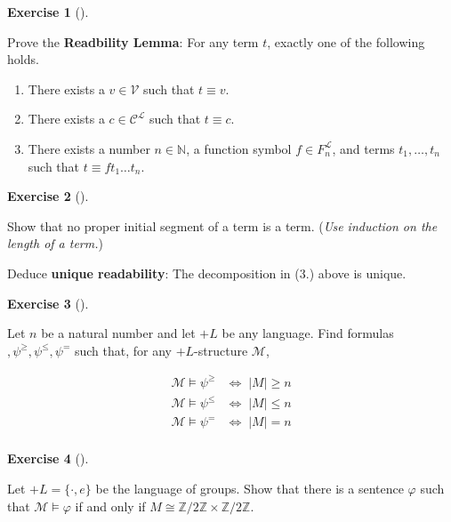 \documentclass[
]{article}
\theoremstyle{definition}
\newtheorem{exercise}{Exercise}[section]
\theoremstyle{remark}
\begin{document}
\begin{exercise}[]\protect\hypertarget{exr-}{}\label{exr-}

\hfill\break
Prove the \textbf{Readbility Lemma}: For any term \(t\), exactly one of
the following holds.

\begin{enumerate}
\def\labelenumi{\arabic{enumi}.}
\item
  There exists a \(v \in \mathcal{V}\) such that \(t \equiv v\).
\item
  There exists a \(c \in \mathcal{C}^{\mathcal{L}}\) such that
  \(t \equiv c\).
\item
  There exists a number \(n \in \mathbb{N}\), a function symbol \(f
  \in F_n^{\mathcal{L}}\), and terms \(t_1,
  \dots, t_n\) such that \(t \equiv ft_1\dots t_n\).
\end{enumerate}

\end{exercise}

\begin{exercise}[]\protect\hypertarget{exr-}{}\label{exr-}

\hfill\break
Show that no proper initial segment of a term is a term. (\emph{Use
induction on the length of a term.})

Deduce \textbf{unique readability}: The decomposition in (3.) above is
unique.

\end{exercise}

\begin{exercise}[]\protect\hypertarget{exr-}{}\label{exr-}

\hfill\break
Let \(n\) be a natural number and let \(+L\) be any language. Find
formulas \(, \psi^{\geq}, \psi^{\leq}, \psi^=\) such that, for any
\(+L\)-structure \(\mathcal{M}\),

\begin{align}
\mathcal{M} \models \psi^{\geq} & \iff \; |M| \geq n \\
\mathcal{M} \models \psi^{\leq} & \iff \; |M| \leq n \\
\mathcal{M} \models \psi^{=} & \iff \; |M| = n \\
\end{align}

\end{exercise}

\begin{exercise}[]\protect\hypertarget{exr-}{}\label{exr-}

\hfill\break
Let \(+L= \{\cdot , e\}\) be the language of groups. Show that there is
a sentence \(\varphi\) such that \(\mathcal{M} \models \varphi\) if and
only if \(M \cong \mathbb{Z}/2\mathbb{Z}\times \mathbb{Z}/2\mathbb{Z}\).

\end{exercise}
\end{document}
